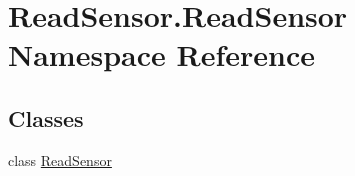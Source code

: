 \hypertarget{namespaceReadSensor_1_1ReadSensor}{}\section{Read\+Sensor.\+Read\+Sensor Namespace Reference}
\label{namespaceReadSensor_1_1ReadSensor}
\subsection*{Classes}
\begin{DoxyCompactItemize}
\item 
class \hyperlink{classReadSensor_1_1ReadSensor_1_1ReadSensor}{Read\+Sensor}
\end{DoxyCompactItemize}
